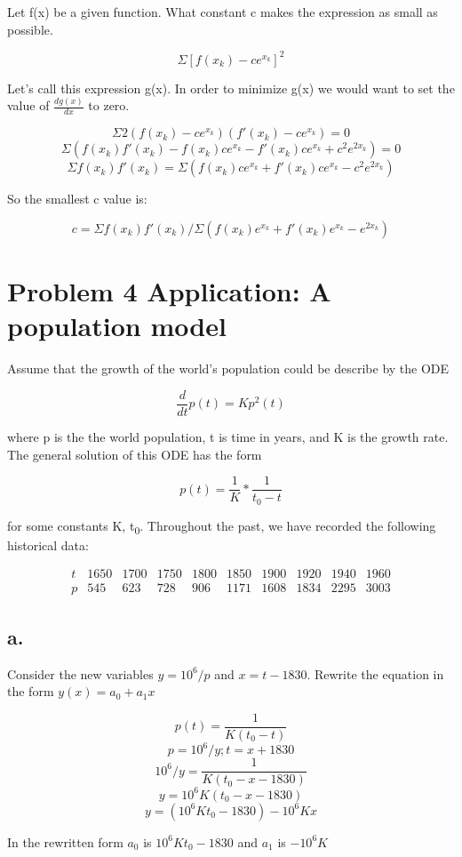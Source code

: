 \documentclass[]{article}
\begin{document}
Let f(x) be a given function. What constant c makes the expression as
small as possible.

\[\Sigma[f(x_k)-ce^{x_k}]^2\]

Let's call this expression g(x). In order to minimize g(x) we would want
to set the value of \(\frac{dg(x)}{dx}\) to zero.

\[\Sigma 2(f(x_k)-ce^{x_k})(f'(x_k)-ce^{x_k}) = 0\]
\[\Sigma (f(x_k)f'(x_k)-f(x_k)ce^{x_k}-f'(x_k)ce^{x_k}+c^2e^{2x_k}) = 0\]
\[\Sigma f(x_k)f'(x_k) = \Sigma (f(x_k)ce^{x_k}+f'(x_k)ce^{x_k}-c^2e^{2x_k})\]

So the smallest c value is:

\[c = \Sigma f(x_k)f'(x_k)/\Sigma (f(x_k)e^{x_k}+f'(x_k)e^{x_k}-e^{2x_k})\]

\section{Problem 4 Application: A population
model}\label{problem-4-application-a-population-model}

Assume that the growth of the world's population could be describe by
the ODE

\[\frac{d}{dt}p(t)=Kp^2(t)\]

where p is the the world population, t is time in years, and K is the
growth rate. The general solution of this ODE has the form

\[p(t) = \frac1K*\frac1{t_0-t}\]

for some constants K, t\textsubscript{0}. Throughout the past, we have
recorded the following historical data:

\[
\begin{array}{c|c|c|c|c|c|c|c|c|c} 
t & 1650 & 1700 & 1750 & 1800 & 1850 & 1900 & 1920 & 1940 & 1960\\
p & 545 & 623 & 728 & 906 & 1171 & 1608 & 1834 & 2295 & 3003
\end{array}
\]

\subsection{a.}\label{a.-1}

Consider the new variables \(y=10^6/p\) and \(x=t-1830\). Rewrite the
equation in the form \(y(x)=a_0+a_1x\)

\[p(t) = \frac1{K(t_0-t)}\] \[p=10^6/y;t=x+1830\]
\[10^6/y = \frac1{K(t_0-x-1830)}\] \[y = 10^6K(t_0-x-1830)\]
\[y = (10^6Kt_0-1830)-10^6Kx\]

In the rewritten form \(a_0\) is \(10^6Kt_0-1830\) and \(a_1\) is
\(-10^6K\)
\end{document}
